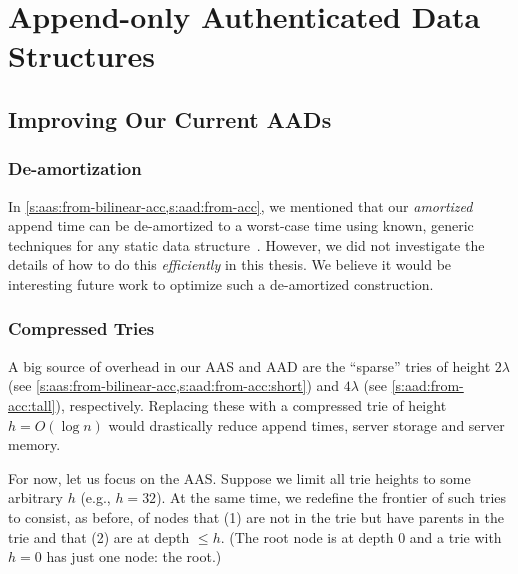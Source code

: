 
\section{Append-only Authenticated Data Structures}
\label{s:future-work:aads}

\subsection{Improving Our Current AADs}
\label{s:future-work:aads:current}

\subsubsection{De-amortization}
\label{s:future-work:aads:current:deamor}
In \cref{s:aas:from-bilinear-acc,s:aad:from-acc}, we mentioned that our \textit{amortized} append time can be de-amortized to a worst-case time using known, generic techniques for any static data structure~\cite{overmars,overmars-van-leeuwen}.
However, we did not investigate the details of how to do this \textit{efficiently} in this thesis.
We believe it would be interesting future work to optimize such a de-amortized construction.

\subsubsection{Compressed Tries}
\label{s:future-work:aads:current:compressed-tries}

A big source of overhead in our AAS and AAD are the ``sparse'' tries of height $2\lambda$ (see \cref{s:aas:from-bilinear-acc,s:aad:from-acc:short}) and $4\lambda$ (see \cref{s:aad:from-acc:tall}), respectively.
Replacing these with a compressed trie of height $h = O(\log{n})$ would drastically reduce append times, server storage and server memory.

For now, let us focus on the AAS.
Suppose we limit all trie heights to some arbitrary $h$ (e.g., $h = 32$).
At the same time, we redefine the frontier of such tries to consist, as before, of nodes that (1) are not in the trie but have parents in the trie and that (2) are at depth $\le h$. 
(The root node is at depth 0 and a trie with $h=0$ has just one node: the root.)

